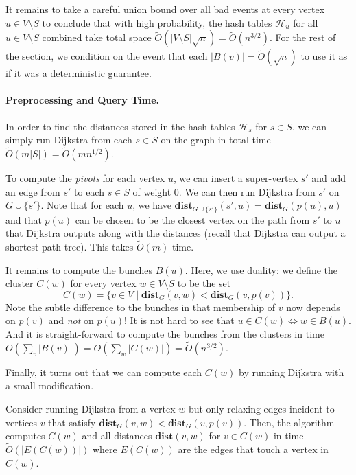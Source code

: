 It remains to take a careful union bound over all bad events at every vertex $u \in V \setminus S$ to conclude that with high probability, the hash tables $\mathcal{H}_u$ for all $u \in V \setminus S$ combined take total space $\tilde{O}(|V \setminus S| \sqrt{n}) = \tilde{O}(n^{3/2})$. For the rest of the section, we condition on the event that each $|B(v)| =\tilde{O}(\sqrt{n})$ to use it as if it was a deterministic guarantee.

\paragraph{Preprocessing and Query Time.} In order to find the distances stored in the hash tables $\mathcal{H}_s$ for $s \in S$, we can simply run Dijkstra from each $s \in S$ on the graph in total time $\tilde{O}(m|S|) = \tilde{O}(mn^{1/2})$.

To compute the \emph{pivots} for each vertex $u$, we can insert a super-vertex $s'$ and add an edge from $s'$ to each $s \in S$ of weight $0$. We can then run Dijkstra from $s'$ on $G \cup \{s'\}$. Note that for each $u$, we have $\mathbf{dist}_{G \cup \{s'\}}(s', u) = \mathbf{dist}_G(p(u),u)$ and that $p(u)$ can be chosen to be the closest vertex on the path from $s'$ to $u$ that Dijkstra outputs along with the distances (recall that Dijkstra can output a shortest path tree). This takes $\tilde{O}(m)$ time.

It remains to compute the bunches $B(u)$. Here, we use duality: we define the cluster $C(w)$ for every vertex $w \in V \setminus S$ to be the set
\[
    C(w) = \{ v \in V \;|\; \mathbf{dist}_G(v,w) < \mathbf{dist}_G(v,p(v))\}.
\]
Note the subtle difference to the bunches in that membership of $v$ now depends on $p(v)$ and \emph{not} on $p(u)$! It is not hard to see that $u \in C(w) \iff w \in B(u)$. And it is straight-forward to compute the bunches from the clusters in time $O(\sum_v |B(v)|) = O(\sum_w |C(w)|) = \tilde{O}(n^{3/2})$. 

Finally, it turns out that we can compute each $C(w)$ by running Dijkstra with a small modification.

\begin{lemma}
Consider running Dijkstra from a vertex $w$ but only relaxing edges incident to vertices $v$ that satisfy $\mathbf{dist}_G(v,w) < \mathbf{dist}_G(v,p(v))$. Then, the algorithm computes $C(w)$ and all distances $\mathbf{dist}(v,w)$ for $v \in C(w)$ in time $\tilde{O}(|E(C(w))|)$ where $E(C(w))$ are the edges that touch a vertex in $C(w)$. 
\end{lemma}
 
